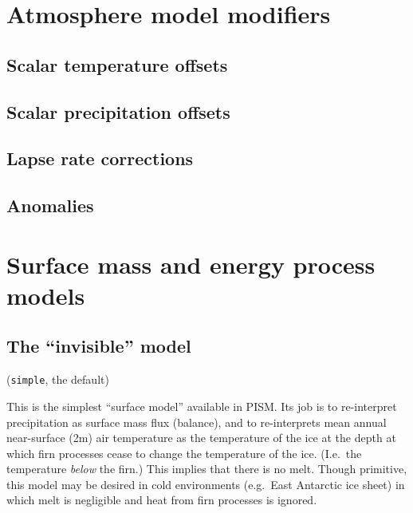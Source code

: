 \documentclass[titlepage,letterpaper,final]{scrartcl}
\def\optsection#1{%
  \def\optindex##1{\index[options]{#1!##1}}
  \def\optseealso##1{\index[options]{#1|see{##1}}}
}
\begin{document}
\section{Atmosphere model modifiers}
\label{sec:atmosphere-mods}

\subsection{Scalar temperature offsets}
\label{sec:delta-temp}

\subsection{Scalar precipitation offsets}
\label{sec:delta-precip}

\subsection{Lapse rate corrections}
\label{sec:lapse-rates}

\subsection{Anomalies}
\label{sec:anomalies}



\section{Surface mass and energy process models}
\label{sec:surface-snow}
\optsection{Climate (boundary) models!\texttt{-surface} [simple, constant, elevation, given, pdd, forcing]}

\subsection{The ``invisible'' model}
\label{sec:invisible-model}

(\texttt{simple}, the default)

This is the simplest ``surface model'' available in PISM. Its job is to
re-interpret precipitation as surface mass flux (balance), and to re-interprets
mean annual near-surface (2m) air temperature as the temperature of the ice at
the depth at which firn processes cease to change the temperature of the ice.
(I.e.~the temperature \emph{below} the firn.) This implies that there is no
melt. Though primitive, this model may be desired in cold environments
(e.g.~East Antarctic ice sheet) in which melt is negligible and heat from firn
processes is ignored.
\end{document}
